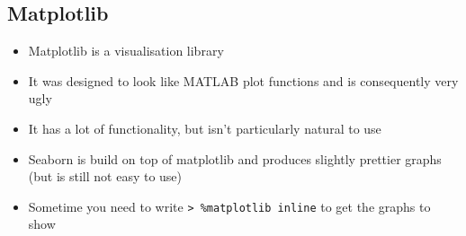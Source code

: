 
\begin{slide}
\section{Matplotlib}

\begin{PauseHighLight}
  \begin{itemize}
  \item Matplotlib is a visualisation library\pause
  \item It was designed to look like MATLAB plot functions\pause{} and
    is consequently very ugly\pauseb
  \item It has a lot of functionality, but isn't particularly natural
    to use\pause
  \item Seaborn is build on top of matplotlib and produces slightly
    prettier graphs (but is still not easy to use)\pause
  \item Sometime you need to write \texttt{> \%matplotlib inline} to
    get the graphs to show\pause
  \end{itemize}
\end{PauseHighLight}

\end{slide}
